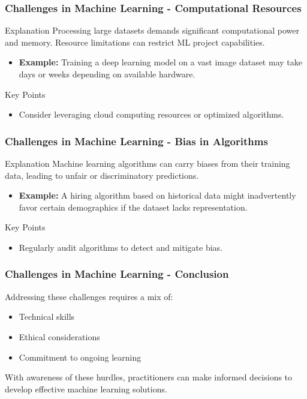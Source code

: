 \documentclass[aspectratio=169]{beamer}
\begin{document}
\begin{frame}[fragile]
    \frametitle{Challenges in Machine Learning - Computational Resources}
    \begin{block}{Explanation}
        Processing large datasets demands significant computational power and memory. 
        Resource limitations can restrict ML project capabilities.
    \end{block}
    \begin{itemize}
        \item \textbf{Example:} Training a deep learning model on a vast image dataset may take days or weeks depending on available hardware.
    \end{itemize}
    \begin{block}{Key Points}
        \begin{itemize}
            \item Consider leveraging cloud computing resources or optimized algorithms.
        \end{itemize}
    \end{block}
\end{frame}

\begin{frame}[fragile]
    \frametitle{Challenges in Machine Learning - Bias in Algorithms}
    \begin{block}{Explanation}
        Machine learning algorithms can carry biases from their training data, leading to unfair or discriminatory predictions.
    \end{block}
    \begin{itemize}
        \item \textbf{Example:} A hiring algorithm based on historical data might inadvertently favor certain demographics if the dataset lacks representation.
    \end{itemize}
    \begin{block}{Key Points}
        \begin{itemize}
            \item Regularly audit algorithms to detect and mitigate bias.
        \end{itemize}
    \end{block}
\end{frame}

\begin{frame}[fragile]
    \frametitle{Challenges in Machine Learning - Conclusion}
    Addressing these challenges requires a mix of:
    \begin{itemize}
        \item Technical skills
        \item Ethical considerations
        \item Commitment to ongoing learning
    \end{itemize}
    With awareness of these hurdles, practitioners can make informed decisions to develop effective machine learning solutions.
\end{frame}
\end{document}
